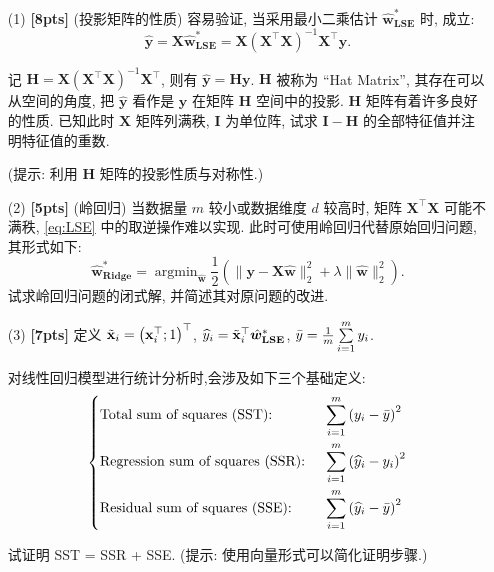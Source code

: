 \documentclass[a4paper,UTF8]{article}
\numberwithin{equation}{section}
\theoremstyle{definition}
\def \X {\mathbf{X}}
\def \w {\hat{\boldsymbol{w}}}
\def \y {\mathbf{y}}
\def \x {\mathbf{x}}
\def \hy {\widehat{y}}
\def \by {\Bar{y}}
\def \H {\mathbf{H}}
\def \I {\mathbf{I}}
\begin{document}
\begin{enumerate}
\item[(1)] \textbf{[8pts]} (投影矩阵的性质) 
容易验证, 当采用最小二乘估计 $\w_{\textbf{LSE}}^*$ 时, 成立: 
\begin{equation*}
    \mathbf{\hy} = \X \w_{\textbf{LSE}}^* = \X\left(\X^\top\X\right)^{-1}\X^\top\y.
\end{equation*}

记 $\H = \X\left(\X^\top\X\right)^{-1}\X^\top$, 则有 $\mathbf{\hy} = \H\y$. $\H$ 被称为 “Hat Matrix”, 其存在可以从空间的角度, 把 $\mathbf{\hy}$ 看作是 $\y$ 在矩阵 $\H$ 空间中的投影. $\H$ 矩阵有着许多良好的性质.
已知此时 $\X$ 矩阵列满秩, $\I$ 为单位阵, 试求 $\I - \H$ 的全部特征值并注明特征值的重数.

(提示: 利用 $\H$ 矩阵的投影性质与对称性.)



\item[(2)] \textbf{[5pts]} (岭回归) 当数据量 $m$ 较小或数据维度 $d$ 较高时, 矩阵 $\X^\top\X$ 可能不满秩, \ref{eq:LSE} 中的取逆操作难以实现. 此时可使用岭回归代替原始回归问题, 其形式如下: 
\begin{equation}
    \label{eq:Ridge}
    \w_{\textbf{Ridge}}^* = \mathop{\arg\min}_{\w} \frac{1}{2}\left(\lVert \y - \X \w \rVert_2^2 +\lambda \lVert \w \rVert_2^2\right).
\end{equation}
试求岭回归问题的闭式解, 并简述其对原问题的改进.

\item[(3)] \textbf{[7pts]} 定义 $\Tilde{\x}_i = \left(\x_i^\top;1\right)^\top$,
$\hy_i = \Tilde{\x}_i^\top \w_{\textbf{LSE}}^*$,
$\by = \frac{1}{m} \sum\limits_{i=1}^m y_i $. 

对线性回归模型进行统计分析时,会涉及如下三个基础定义: 
\begin{equation*}
    \left\{
        \begin{aligned}
        &\text{Total sum of squares (SST): }& &\sum\limits_{i=1}^m\left(y_i-\by\right)^2 \\
        &\text{Regression sum of squares (SSR): }& &\sum\limits_{i=1}^m\left(\hy_i-y_i\right)^2 \\
        &\text{Residual sum of squares (SSE): }& &\sum\limits_{i=1}^m\left(\hy_i-\by\right)^2
        \end{aligned}
    \right.
\end{equation*}

试证明 SST = SSR + SSE. (提示: 使用向量形式可以简化证明步骤.)



\end{enumerate}
\end{document}
